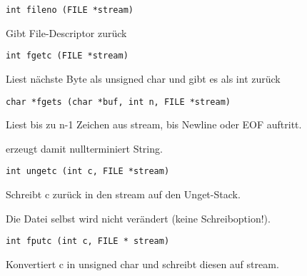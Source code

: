 \begin{multicols*}{5}
			

			\vspace{-6pt}
			\begin{lstlisting}
int fileno (FILE *stream)
			\end{lstlisting}
			\vspace{-6pt}
			\begin{compactitem}[$\bullet$]
			\item Gibt File-Descriptor zurück
			\end{compactitem}


			\vspace{-6pt}
			\begin{lstlisting}
int fgetc (FILE *stream)
			\end{lstlisting}
			\vspace{-6pt}
			\begin{compactitem}[$\bullet$]
			\item Liest nächste Byte als unsigned char und gibt es als int zurück
			\end{compactitem}


			\vspace{-6pt}
			\begin{lstlisting}
char *fgets (char *buf, int n, FILE *stream)
			\end{lstlisting}
			\vspace{-6pt}
			\begin{compactitem}[$\bullet$]
			\item Liest bis zu n-1 Zeichen aus stream, bis Newline oder EOF auftritt.
			\item erzeugt damit nullterminiert String.
			\end{compactitem}



			\vspace{-6pt}
			\begin{lstlisting}
int ungetc (int c, FILE *stream)
			\end{lstlisting}
			\vspace{-6pt}
			\begin{compactitem}[$\bullet$]
			\item Schreibt c zurück in den stream auf den Unget-Stack. 
			\item Die Datei selbst wird nicht verändert (keine Schreiboption!). 
			\end{compactitem}


			\vspace{-6pt}
			\begin{lstlisting}
int fputc (int c, FILE * stream)
			\end{lstlisting}
			\vspace{-6pt}
			\begin{compactitem}[$\bullet$]
			\item Konvertiert c in unsigned char und schreibt diesen auf stream.
			\end{compactitem}



\end{multicols*}

